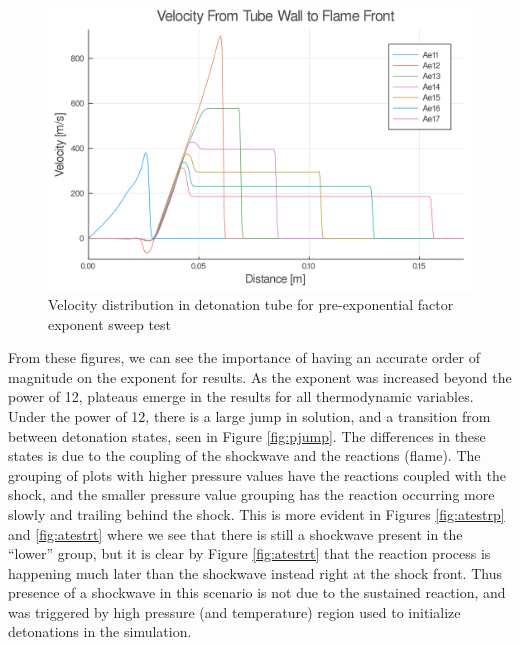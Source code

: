 \begin{figure}
\centering
\includegraphics[width=0.85\linewidth]{./figs/Atest/u.png}
\caption{Velocity distribution in detonation tube for pre-exponential factor exponent sweep test}
\label{fig:atestu}
\end{figure}

From these figures, we can see the importance of having an accurate order of magnitude on the exponent for results. As the exponent was increased beyond the power of 12, plateaus emerge in the results for all thermodynamic variables. Under the power of 12, there is a large jump in solution, and a transition from between detonation states, seen in Figure \ref{fig:pjump}. The differences in these states is due to the coupling of the shockwave and the reactions (flame). The grouping of plots with higher pressure values have the reactions coupled with the shock, and the smaller pressure value grouping has the reaction occurring more slowly and trailing behind the shock. This is more evident in Figures \ref{fig:atestrp} and \ref{fig:atestrt} where we see that there is still a shockwave present in the ``lower'' group, but it is clear by Figure \ref{fig:atestrt} that the reaction process is happening much later than the shockwave instead right at the shock front. Thus presence of a shockwave in this scenario is not due to the sustained reaction, and was triggered by high pressure (and temperature) region used to initialize detonations in the simulation. 

